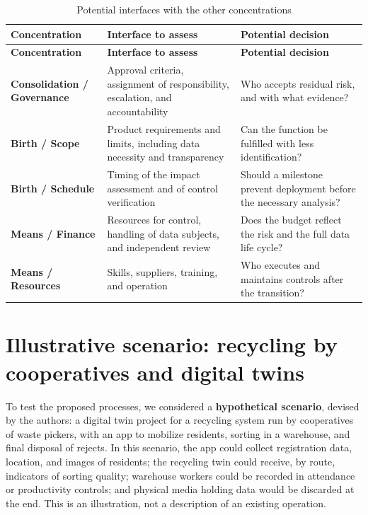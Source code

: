 \documentclass[11pt,a4paper]{article}
\newcommand{\SingleSpacing}{}
\newcommand{\fontetab}[1]{\par\vspace{3pt}{\small\noindent Source: #1\par}}
\begin{document}
\begingroup\SingleSpacing\small
\begin{longtable}{@{}>{\raggedright\arraybackslash}p{}>{\raggedright\arraybackslash}p{}>{\raggedright\arraybackslash}p{}@{}}
\caption{Potential interfaces with the other concentrations}\label{tab:t11}\\
\toprule
\textbf{Concentration} & \textbf{Interface to assess} & \textbf{Potential decision}\\
\midrule
\endfirsthead
\toprule
\textbf{Concentration} & \textbf{Interface to assess} & \textbf{Potential decision}\\
\midrule
\endhead
\bottomrule
\endfoot
\bottomrule
\endlastfoot
\textbf{Consolidation / Governance} & Approval criteria, assignment of responsibility, escalation, and accountability & Who accepts residual risk, and with what evidence?\\[3pt]
\textbf{Birth / Scope} & Product requirements and limits, including data necessity and transparency & Can the function be fulfilled with less identification?\\[3pt]
\textbf{Birth / Schedule} & Timing of the impact assessment and of control verification & Should a milestone prevent deployment before the necessary analysis?\\[3pt]
\textbf{Means / Finance} & Resources for control, handling of data subjects, and independent review & Does the budget reflect the risk and the full data life cycle?\\[3pt]
\textbf{Means / Resources} & Skills, suppliers, training, and operation & Who executes and maintains controls after the transition?\\[3pt]
\end{longtable}
\endgroup
\fontetab{Prepared by the authors (2026).}

\section{Illustrative scenario: recycling by cooperatives and digital twins}

To test the proposed processes, we considered a \textbf{hypothetical scenario}, devised by the authors: a digital twin project for a recycling system run by cooperatives of waste pickers, with an app to mobilize residents, sorting in a warehouse, and final disposal of rejects. In this scenario, the app could collect registration data, location, and images of residents; the recycling twin could receive, by route, indicators of sorting quality; warehouse workers could be recorded in attendance or productivity controls; and physical media holding data would be discarded at the end. This is an illustration, not a description of an existing operation.
\end{document}
